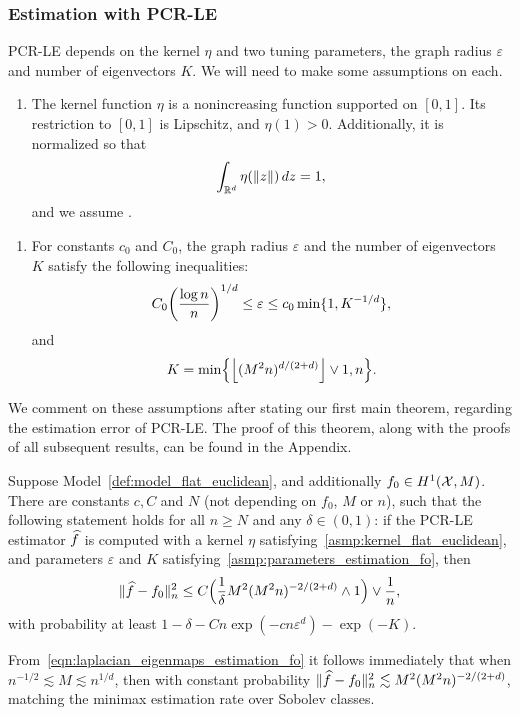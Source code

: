 \subsubsection{Estimation with PCR-LE} 
PCR-LE depends on the kernel $\eta$ and two tuning parameters, the graph radius $\varepsilon$ and number of eigenvectors $K$. We will need to make some assumptions on each.
\begin{enumerate}[label=(K\arabic*)]
	\setcounter{enumi}{0}
	\item
	\label{asmp:kernel_flat_euclidean}
	The kernel function $\eta$ is a nonincreasing function supported on $[0,1]$. Its restriction to $[0,1]$ is Lipschitz, and $\eta(1) > 0$. Additionally, it is normalized so that
	\begin{equation*}
	\int_{\mathbb{R}^d} \eta(\|z\|) \,dz = 1,
	\end{equation*}
	and we assume .
\end{enumerate}
\begin{enumerate}[label=(P\arabic*)]
	\setcounter{enumi}{0}
	\item 
	\label{asmp:parameters_estimation_fo} 
	For constants $c_0$ and $C_0$, the graph radius $\varepsilon$ and the number of eigenvectors $K$ satisfy the following inequalities:
	\begin{equation}\\
	\label{eqn:radius_fo} 
	C_0\biggl(\frac{\log n}{n}\biggr)^{1/d} \leq \varepsilon \leq c_0\min\{1,K^{-1/d}\},
	\end{equation}
	and 
	\begin{equation}
	\label{eqn:eigenvector_estimation_fo} 
	K = \min\Bigl\{\left\lfloor (M^2n)^{d/(2 + d)} \right\rfloor \vee 1, n\Bigr\}.
	\end{equation}
\end{enumerate}
We comment on these assumptions after stating our first main theorem, regarding the estimation error of PCR-LE. The proof of this theorem, along with the proofs of all subsequent results, can be found in the Appendix.
\begin{theorem}
	\label{thm:laplacian_eigenmaps_estimation_fo}
	Suppose Model~\ref{def:model_flat_euclidean}, and additionally $f_0 \in H^1(\mathcal{X},M)$. There are constants $c,C$ and $N$ (not depending on $f_0$, $M$ or $n$), such that the following statement holds for all $n \geq N$ and any $\delta \in (0,1)$: if the PCR-LE estimator $\widehat{f}$ is computed with a kernel $\eta$ satisfying~\ref{asmp:kernel_flat_euclidean}, and parameters $\varepsilon$ and $K$ satisfying~\ref{asmp:parameters_estimation_fo}, then
	\begin{equation}
	\label{eqn:laplacian_eigenmaps_estimation_fo}
	\|\widehat{f} - f_0\|_n^2 \leq C\Bigl(\frac{1}{\delta}M^2(M^2n)^{-2/(2 + d)} \wedge 1\Bigr) \vee \frac{1}{n},
	\end{equation}
	with probability at least $1 - \delta - Cn\exp(-cn\varepsilon^d) - \exp(-K)$.
\end{theorem}
From~\eqref{eqn:laplacian_eigenmaps_estimation_fo} it follows immediately that when $n^{-1/2} \lesssim M \lesssim n^{1/d}$, then with constant probability $\|\widehat{f} - f_0\|_n^2 \lesssim M^2(M^2n)^{-2/(2 + d)}$, matching the minimax estimation rate over Sobolev classes.

